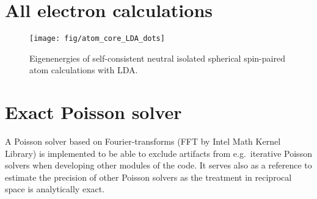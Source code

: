 \documentclass[oribibl]{llncs}
\newcommand{\ttt}[1]{\texttt{#1}}
\begin{document}
\section{All electron calculations} \label{sec:all-electron}
%
\begin{figure}
  \begin{minipage}[c]{.990\textwidth}
	\texttt{[image: fig/atom\_core\_LDA\_dots]} %
  \end{minipage}\hfill
  \begin{minipage}[c]{.009\textwidth}
  \end{minipage}
  \label{fig:atom_core_levels}
  \caption{
	Eigenenergies of self-consistent neutral isolated spherical spin-paired atom calculations with LDA.
  }
\end{figure}
%
%

\section{Exact Poisson solver}
%
%
%
A Poisson solver based on Fourier-transforms (FFT by Intel Math Kernel Library)
is implemented to be able to exclude artifacts from e.g.~iterative Poisson solvers
when developing other modules of the code. 
It serves also as a reference to estimate the precision of other Poisson solvers
as the treatment in reciprocal space is analytically exact.
\end{document}
